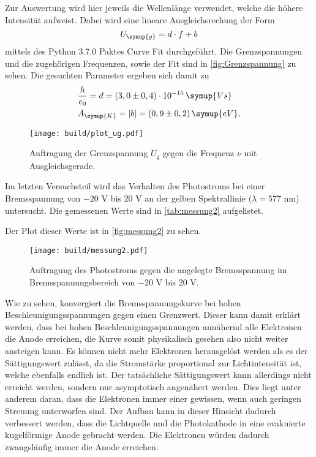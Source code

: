 Zur Auswertung wird hier jeweils die Wellenlänge verwendet, welche die höhere Intensität aufweist.
Dabei wird eine lineare Ausgleichsrechung der Form
\begin{equation}
  \label{eqn:ausgleich2}
  U_{\symup{g}} = d \cdot f + b
\end{equation}
mittels des Python 3.7.0  Paktes Curve Fit durchgeführt. Die Grenzspannungen und die zugehörigen Frequenzen, sowie der Fit sind in \autoref{fig:Grenzspannung} zu sehen.
Die gesuchten Parameter ergeben sich damit zu 
\begin{align*}
  & \frac{h}{e_0} = d               = (3,0 \pm 0,4) \cdot 10^{-15} \, \symup{Vs} \\
  & A_{\symup{K}} = \lvert b \rvert = (0,9 \pm 0,2) \, \symup{eV}. \\
\end{align*}  

\begin{figure}
    \centering
    \texttt{[image: build/plot\_ug.pdf]}
    \caption{Auftragung der Grenzspannung $U_\text{g}$ gegen die Frequenz $\nu$ mit Ausgleichsgerade.}
    \label{fig:Grenzspannung}
\end{figure}    



Im letzten Versuchsteil wird das Verhalten des Photostroms bei einer Bremsspannung von $-20$ V bis $20$ V an der gelben Spektrallinie
($\lambda = 577$ nm) untersucht. Die gemessenen Werte sind in \autoref{tab:messung2} aufgelistet.

Der Plot dieser Werte ist in \autoref{fig:messung2} zu sehen.
\begin{figure}
    \centering
    \texttt{[image: build/messung2.pdf]}
    \caption{Auftragung des Photostroms gegen die angelegte Bremsspannung im Bremsspannungsbereich von $-20$ V bis $20$ V.}
    \label{fig:messung2}
\end{figure}
Wie zu sehen, konvergiert die Bremsspannungskurve bei hohen Beschleunigungsspannungen gegen einen Grenzwert. Dieser
kann damit erklärt werden, dass bei hohen Beschleunigungsspannungen
annähernd alle Elektronen die Anode erreichen, die Kurve somit physikalisch gesehen also nicht weiter ansteigen kann. Es können nicht mehr Elektronen 
herausgelöst werden als es der Sättigungswert zulässt, da die Stromstärke proportional zur Lichtintensität ist, welche ebenfalls endlich ist. 
Der tatsächliche Sättigungswert kann allerdings nicht erreicht werden, sondern nur asymptotisch angenähert werden. Dies liegt unter anderem daran,
dass die Elektronen immer einer gewissen, wenn auch geringen Streuung unterworfen sind. Der Aufbau kann in dieser Hinsicht dadurch verbessert werden, 
dass die Lichtquelle und die Photokathode in eine evakuierte kugelförmige Anode gebracht werden. Die Elektronen würden dadurch zwangsläufig 
immer die Anode erreichen.
 
